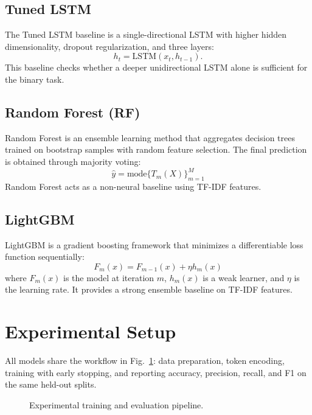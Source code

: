 \subsection{Tuned LSTM}

The Tuned LSTM baseline is a single-directional LSTM with higher hidden dimensionality, dropout regularization, and three layers:
\[
h_t = \mathrm{LSTM}(x_t, h_{t-1}).
\]
This baseline checks whether a deeper unidirectional LSTM alone is sufficient for the binary task.

\subsection{Random Forest (RF)}

Random Forest \cite{ref5} is an ensemble learning method that aggregates decision trees trained on bootstrap samples with random feature selection. The final prediction is obtained through majority voting:
\begin{equation}
\hat{y} = \mathrm{mode} \{T_m(X)\}_{m=1}^{M}
\end{equation}
Random Forest acts as a non-neural baseline using TF-IDF features.

\subsection{LightGBM}

LightGBM \cite{ref6} is a gradient boosting framework that minimizes a differentiable loss function sequentially:
\begin{equation}
F_m(x) = F_{m-1}(x) + \eta h_m(x)
\end{equation}
where $F_m(x)$ is the model at iteration $m$, $h_m(x)$ is a weak learner, and $\eta$ is the learning rate. It provides a strong ensemble baseline on TF-IDF features.

\section{Experimental Setup}

All models share the workflow in Fig.~\ref{fig:pipeline}: data preparation, token encoding, training with early stopping, and reporting accuracy, precision, recall, and F1 on the same held-out splits.

\begin{figure}[!t]
\centering

\caption{Experimental training and evaluation pipeline.}
\label{fig:pipeline}
\end{figure}


